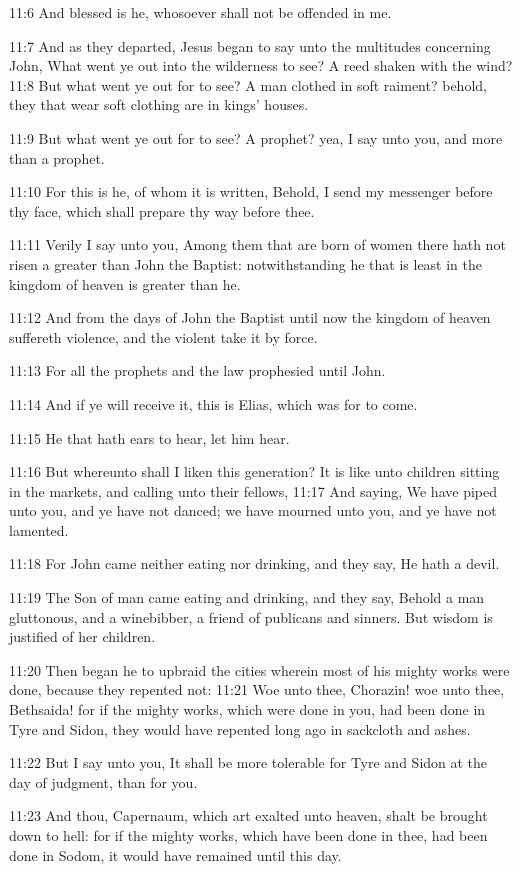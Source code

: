 11:6 And blessed is he, whosoever shall not be offended in me.

11:7 And as they departed, Jesus began to say unto the multitudes concerning John, What went ye out into the wilderness to see? A reed shaken with the wind?  11:8 But what went ye out for to see? A man clothed in soft raiment?  behold, they that wear soft clothing are in kings' houses.

11:9 But what went ye out for to see? A prophet? yea, I say unto you, and more than a prophet.

11:10 For this is he, of whom it is written, Behold, I send my messenger before thy face, which shall prepare thy way before thee.

11:11 Verily I say unto you, Among them that are born of women there hath not risen a greater than John the Baptist: notwithstanding he that is least in the kingdom of heaven is greater than he.

11:12 And from the days of John the Baptist until now the kingdom of heaven suffereth violence, and the violent take it by force.

11:13 For all the prophets and the law prophesied until John.

11:14 And if ye will receive it, this is Elias, which was for to come.

11:15 He that hath ears to hear, let him hear.

11:16 But whereunto shall I liken this generation? It is like unto children sitting in the markets, and calling unto their fellows, 11:17 And saying, We have piped unto you, and ye have not danced; we have mourned unto you, and ye have not lamented.

11:18 For John came neither eating nor drinking, and they say, He hath a devil.

11:19 The Son of man came eating and drinking, and they say, Behold a man gluttonous, and a winebibber, a friend of publicans and sinners.  But wisdom is justified of her children.

11:20 Then began he to upbraid the cities wherein most of his mighty works were done, because they repented not: 11:21 Woe unto thee, Chorazin! woe unto thee, Bethsaida! for if the mighty works, which were done in you, had been done in Tyre and Sidon, they would have repented long ago in sackcloth and ashes.

11:22 But I say unto you, It shall be more tolerable for Tyre and Sidon at the day of judgment, than for you.

11:23 And thou, Capernaum, which art exalted unto heaven, shalt be brought down to hell: for if the mighty works, which have been done in thee, had been done in Sodom, it would have remained until this day.

